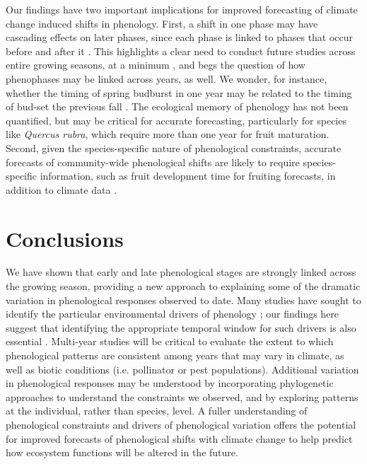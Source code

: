 \documentclass{article}
\begin{document}
\par Our findings have two important implications for improved forecasting of climate change induced shifts in phenology. First, a shift in one phase may have cascading effects on later phases, since each phase is linked to phases that occur before and after it \citep{wolkovich2014b}. This highlights a clear need to conduct future studies across entire growing seasons, at a minimum \citep{wolkovich2014}, and begs the question of how phenophases may be linked across years, as well. We wonder, for instance, whether the timing of spring budburst in one year may be related to the timing of bud-set the previous fall \citep {mimura2010}. The ecological memory \citep {ogle2015} of phenology has not been quantified, but may be critical for accurate forecasting, particularly for species like \emph{Quercus rubra}, which require more than one year for fruit maturation. Second, given the species-specific nature of phenological constraints, accurate forecasts of community-wide phenological shifts are likely to require species-specific information, such as fruit development time for fruiting forecasts, in addition to climate data \citep{diez2012}. %

\section* {Conclusions}
We have shown that early and late phenological stages are strongly linked across the growing season, providing a new approach to explaining some of the dramatic variation in phenological responses observed to date.  Many studies have sought to identify the particular environmental drivers of phenology \citep [e.g.][]{morin2010,schwartz2013}; our findings here suggest that identifying the appropriate temporal window for such drivers is also essential \citep{teller2016}.  
Multi-year studies will be critical to evaluate the extent to which phenological patterns are consistent among years that may vary in climate, as well as biotic conditions (i.e. pollinator or pest populations). Additional variation in phenological responses may be understood by incorporating phylogenetic approaches to understand the constraints we observed, and by exploring patterns at the individual, rather than species, level. A fuller understanding of phenological constraints and drivers of phenological variation offers the potential for improved forecasts of phenological shifts  with climate change to help predict how ecosystem functions will be altered in the future. %
\end{document}
